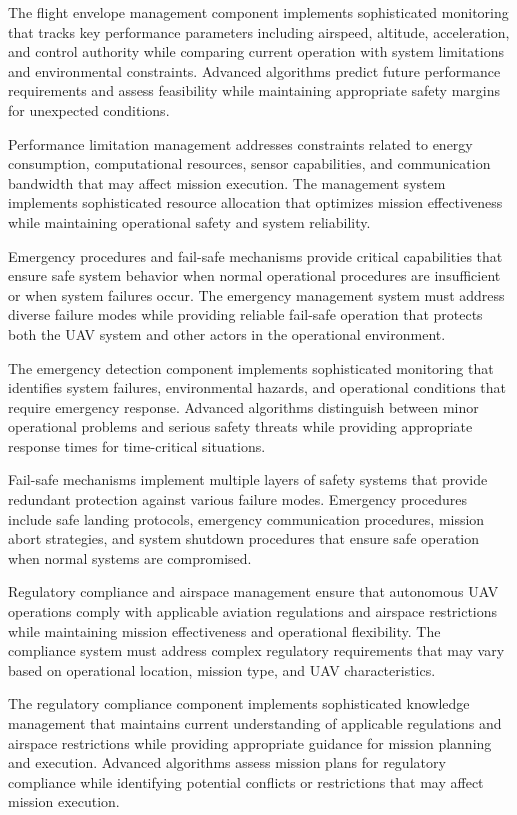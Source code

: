 The flight envelope management component implements sophisticated monitoring that tracks key performance parameters including airspeed, altitude, acceleration, and control authority while comparing current operation with system limitations and environmental constraints. Advanced algorithms predict future performance requirements and assess feasibility while maintaining appropriate safety margins for unexpected conditions.

Performance limitation management addresses constraints related to energy consumption, computational resources, sensor capabilities, and communication bandwidth that may affect mission execution. The management system implements sophisticated resource allocation that optimizes mission effectiveness while maintaining operational safety and system reliability.

Emergency procedures and fail-safe mechanisms provide critical capabilities that ensure safe system behavior when normal operational procedures are insufficient or when system failures occur. The emergency management system must address diverse failure modes while providing reliable fail-safe operation that protects both the UAV system and other actors in the operational environment.

The emergency detection component implements sophisticated monitoring that identifies system failures, environmental hazards, and operational conditions that require emergency response. Advanced algorithms distinguish between minor operational problems and serious safety threats while providing appropriate response times for time-critical situations.

Fail-safe mechanisms implement multiple layers of safety systems that provide redundant protection against various failure modes. Emergency procedures include safe landing protocols, emergency communication procedures, mission abort strategies, and system shutdown procedures that ensure safe operation when normal systems are compromised.

Regulatory compliance and airspace management ensure that autonomous UAV operations comply with applicable aviation regulations and airspace restrictions while maintaining mission effectiveness and operational flexibility. The compliance system must address complex regulatory requirements that may vary based on operational location, mission type, and UAV characteristics.

The regulatory compliance component implements sophisticated knowledge management that maintains current understanding of applicable regulations and airspace restrictions while providing appropriate guidance for mission planning and execution. Advanced algorithms assess mission plans for regulatory compliance while identifying potential conflicts or restrictions that may affect mission execution.

